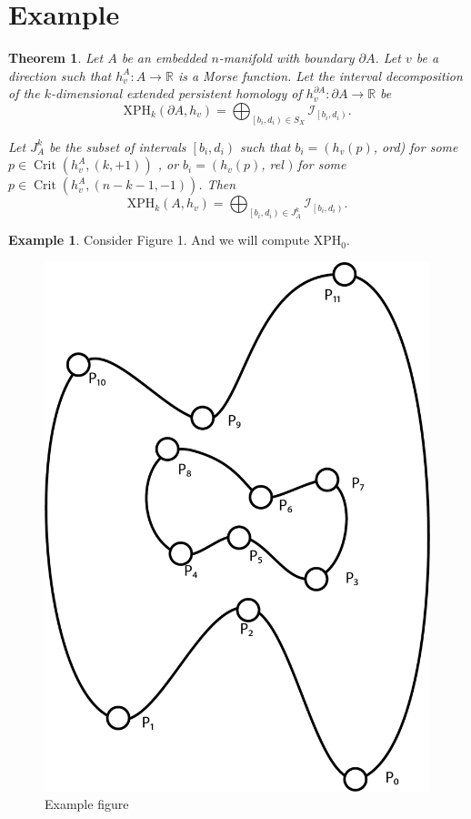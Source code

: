 \documentclass[a4paper]{article}
\theoremstyle{theorem}
\newtheorem{theorem}{Theorem}[section]
\theoremstyle{definition}
\newtheorem{example}{Example}
\theoremstyle{remark}
\theoremstyle{gremark}
\theoremstyle{discussion}
\theoremstyle{notation}
\begin{document}
	
	
	
\section*{Example}

\begin{theorem}
	Let $A$ be an embedded $n$-manifold with boundary $\partial A$. Let $v$ be a direction such that $h_v^{A}: A \rightarrow \mathbb{R}$ is a Morse function. Let the interval	decomposition of the $k$-dimensional extended persistent homology of $h_v^{\partial A}: \partial A \rightarrow \mathbb{R}$ be
	$$
	\mathrm{XPH}_k\left(\partial A, h_v\right)=\bigoplus_{\left[b_i, d_i\right) \in S_X} \mathcal{I}_{\left[b_i, d_i\right)} .
	$$
	
	Let $J_A^k$ be the subset of intervals $\left[b_i, d_i\right)$ such that $b_i=\left(h_v(p)\right.$, ord) for some $p \in \operatorname{Crit}\left(h_v^A,(k,+1)\right)$ , or $b_i=\left(h_v(p)\right.$, rel $)$ for some $p \in \operatorname{Crit}\left(h_v^A,(n-k-1,-1)\right)$. Then
	$$
	\mathrm{XPH}_k\left(A, h_v\right)=\bigoplus_{\left[b_i, d_i\right) \in J_A^k} \mathcal{I}_{\left[b_i, d_i\right)} .
	$$
\end{theorem}


\begin{example}
	Consider Figure 1. And we will compute $\mathrm{XPH}_0$.
\end{example}

\begin{figure}[ht]
	\centering
	\includegraphics[scale=0.5]{example_figure_1.png}
	\caption{Example figure}
\end{figure}
	
\end{document}

